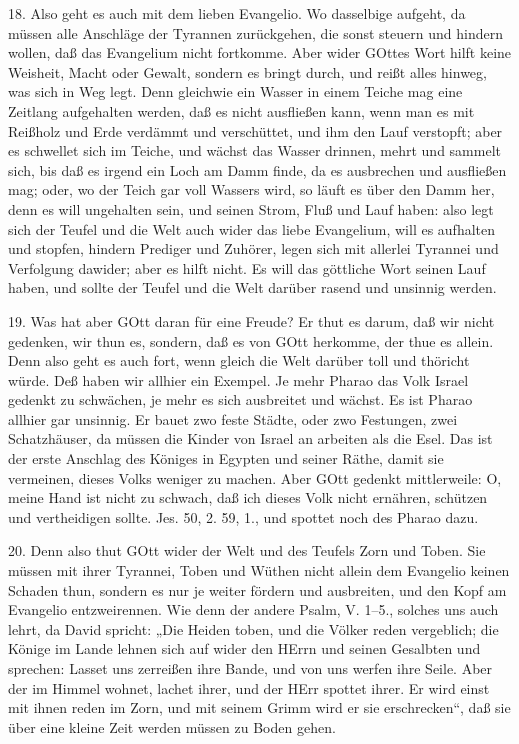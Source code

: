 18. Also geht es auch mit dem lieben Evangelio. Wo dasselbige aufgeht, da müssen alle Anschläge der Tyrannen zurückgehen, die sonst steuern und hindern wollen, daß das Evangelium nicht fortkomme. Aber wider GOttes Wort
hilft keine Weisheit, Macht oder Gewalt, sondern es bringt durch, und reißt alles hinweg, was sich in Weg legt. Denn gleichwie ein Wasser in einem Teiche mag eine Zeitlang aufgehalten werden, daß es nicht ausfließen kann, wenn man es mit Reißholz und Erde verdämmt und verschüttet, und ihm den Lauf verstopft; aber es schwellet sich im Teiche, und wächst das Wasser drinnen, mehrt und sammelt sich, bis daß es irgend ein Loch am Damm finde, da es ausbrechen und ausfließen mag; oder, wo der Teich gar voll Wassers wird, so läuft es über den Damm her, denn es will ungehalten sein, und seinen Strom, Fluß und Lauf haben: also legt sich der Teufel und die Welt auch wider das liebe Evangelium, will es aufhalten und stopfen, hindern Prediger und Zuhörer, legen sich mit allerlei Tyrannei und Verfolgung dawider; aber es hilft nicht. Es will das göttliche Wort seinen Lauf haben, und sollte der Teufel und die Welt darüber rasend und unsinnig werden.

19. Was hat aber GOtt daran für eine Freude? Er thut es darum, daß wir nicht gedenken, wir thun es, sondern, daß es von GOtt herkomme, der thue es allein. Denn also geht es auch fort, wenn gleich die Welt darüber toll und thöricht würde. Deß haben wir allhier ein Exempel. Je mehr Pharao das Volk Israel gedenkt zu schwächen, je mehr es sich ausbreitet und wächst. Es ist Pharao allhier gar unsinnig. Er bauet zwo feste Städte, oder zwo Festungen, zwei Schatzhäuser, da müssen die Kinder von Israel an arbeiten als die Esel. Das ist der erste Anschlag des Königes in Egypten und seiner Räthe, damit sie vermeinen, dieses Volks weniger zu machen. Aber GOtt gedenkt mittlerweile: O, meine Hand ist nicht zu schwach, daß ich dieses Volk nicht ernähren, schützen und vertheidigen sollte. Jes. 50, 2. 59, 1., und spottet noch des Pharao dazu.

20. Denn also thut GOtt wider der Welt und des Teufels Zorn und Toben. Sie müssen mit ihrer Tyrannei, Toben und Wüthen nicht allein dem Evangelio keinen Schaden thun, sondern es nur je weiter fördern und ausbreiten, und den Kopf am Evangelio entzweirennen. Wie denn der andere Psalm, V. 1–5., solches uns auch lehrt, da David spricht: „Die Heiden toben, und die Völker reden vergeblich; die Könige im Lande lehnen sich auf wider den HErrn und seinen Gesalbten und sprechen: Lasset uns zerreißen ihre Bande, und von uns werfen ihre Seile. Aber der im Himmel wohnet, lachet ihrer, und der HErr spottet ihrer. Er wird einst mit ihnen reden im Zorn, und mit seinem Grimm wird er sie erschrecken“, daß sie über eine kleine Zeit werden müssen zu Boden gehen.

